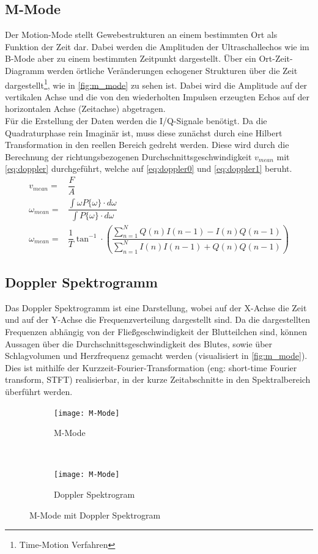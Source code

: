 \subsection{M-Mode}\label{m-mode}
Der \glqq Motion-Mode\grqq{} stellt Gewebestrukturen an einem bestimmten Ort als Funktion der Zeit dar. Dabei werden die Amplituden der Ultraschallechos wie im B-Mode aber zu einem bestimmten Zeitpunkt dargestellt. Über ein Ort-Zeit-Diagramm werden örtliche Veränderungen echogener Strukturen über die Zeit dargestellt\footnote{Time-Motion Verfahren}, wie in \autoref{fig:m_mode} zu sehen ist. Dabei wird die Amplitude auf der vertikalen Achse und die von den wiederholten Impulsen erzeugten Echos auf der horizontalen Achse (Zeitachse) abgetragen.\\
Für die Erstellung der Daten werden die I/Q-Signale benötigt. Da die Quadraturphase rein Imaginär ist, muss diese zunächst durch eine Hilbert Transformation in den reellen Bereich gedreht werden. Diese wird durch die Berechnung der richtungsbezogenen Durchschnittsgeschwindigkeit $v_{mean}$ mit \autoref{eq:doppler} durchgeführt, welche auf \autoref{eq:doppler0} und \autoref{eq:doppler1} beruht.\cite[Kap. 4 S. 41ff]{brucher_ultra}
\begin{eqnarray}
v_{mean}=&\dfrac{F}{A}\label{eq:doppler0}\\
\omega_{mean}=&\dfrac{\int \omega P \lbrace \omega\rbrace\cdot d\omega}{\int P \lbrace \omega\rbrace\cdot d\omega}\label{eq:doppler1}\\
\omega_{mean}=&\dfrac{1}{T}\tan^{-1}\cdot \left(\dfrac{\sum_{n=1}^N Q(n)I\left(n-1\right)-I(n)Q\left(n-1\right)}{\sum_{n=1}^N I(n)I\left(n-1\right)+Q(n)Q\left(n-1\right)}\right)\label{eq:doppler}
\end{eqnarray}
\subsection{Doppler Spektrogramm}\label{spektrogramm}
Das Doppler Spektrogramm ist eine Darstellung, wobei auf der X-Achse die Zeit und auf der Y-Achse die Frequenzverteilung dargestellt sind. Da die dargestellten Frequenzen abhängig von der Fließgeschwindigkeit der Blutteilchen sind, können Aussagen über die Durchschnittsgeschwindigkeit des Blutes, sowie über Schlagvolumen und Herzfrequenz gemacht werden (visualisiert in \autoref{fig:m_mode}). Dies ist mithilfe der Kurzzeit-Fourier-Transformation (eng: short-time Fourier transform, STFT) realisierbar, in der kurze Zeitabschnitte in den Spektralbereich überführt werden.
\begin{figure}[h!]
  \centering
  \begin{subfigure}[b]{0.48\textwidth}
  \texttt{[image: M-Mode]} 
  \caption{M-Mode}
\end{subfigure}
~
\begin{subfigure}[b]{0.48\textwidth}
  \centering
  \texttt{[image: M-Mode]}  
	\caption{Doppler Spektrogram}
	\label{fig:dopp_spectrogramm}
  \label{fig:b_mode}
  \end{subfigure}
	\caption{M-Mode mit Doppler Spektrogram}
	\label{fig:m_mode}
\end{figure}


